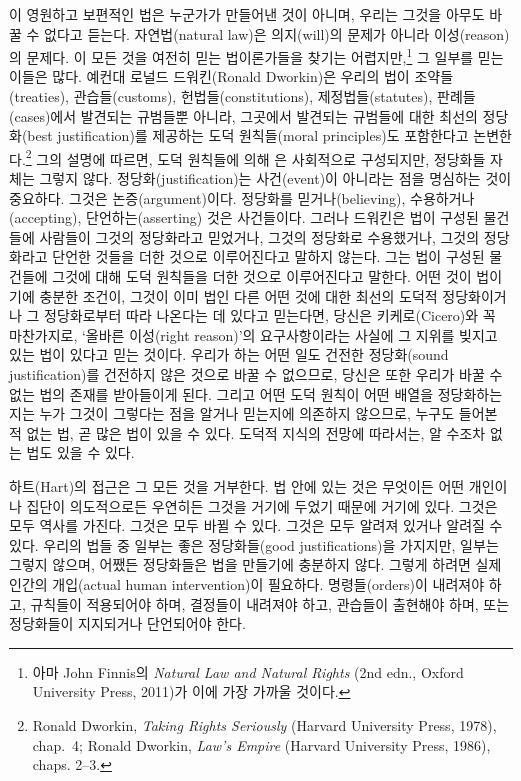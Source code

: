이 영원하고 보편적인 법은 누군가가 만들어낸 것이 아니며, 우리는 그것을
아무도 바꿀 수 없다고 듣는다. 자연법(natural law)은 의지(will)의 문제가
아니라 이성(reason)의 문제다. 이 모든 것을 여전히 믿는 법이론가들을
찾기는 어렵지만,\footnote{아마 John Finnis의 \emph{Natural Law and
  Natural Rights} (2nd edn., Oxford University Press, 2011)가 이에 가장
  가까울 것이다.} 그 일부를 믿는 이들은 많다. 예컨대 로널드
드워킨(Ronald Dworkin)은 우리의 법이 조약들(treaties), 관습들(customs),
헌법들(constitutions), 제정법들(statutes), 판례들(cases)에서 발견되는
규범들뿐 아니라, 그곳에서 발견되는 규범들에 대한 최선의 정당화(best
justification)를 제공하는 도덕 원칙들(moral principles)도 포함한다고
논변한다.\footnote{Ronald Dworkin, \emph{Taking Rights Seriously}
  (Harvard University Press, 1978), chap.~4; Ronald Dworkin, \emph{Law's
  Empire} (Harvard University Press, 1986), chaps. 2--3.} 그의 설명에
따르면, 도덕 원칙들에 의해 은
사회적으로 구성되지만, 정당화들 자체는 그렇지 않다.
정당화(justification)는 사건(event)이 아니라는 점을 명심하는 것이
중요하다. 그것은 논증(argument)이다. 정당화를 믿거나(believing),
수용하거나(accepting), 단언하는(asserting) 것은 사건들이다. 그러나
드워킨은 법이 구성된 물건들에 사람들이 그것의 정당화라고 믿었거나,
그것의 정당화로 수용했거나, 그것의 정당화라고 단언한 것들을 더한 것으로
이루어진다고 말하지 않는다. 그는 법이 구성된 물건들에 그것에 대해
 도덕 원칙들을 더한 것으로 이루어진다고 말한다.
어떤 것이 법이기에 충분한 조건이, 그것이 이미 법인 다른 어떤 것에 대한
최선의 도덕적 정당화이거나 그 정당화로부터 따라 나온다는 데 있다고
믿는다면, 당신은 키케로(Cicero)와 꼭 마찬가지로, ‘올바른 이성(right
reason)’의 요구사항이라는 사실에 그 지위를 빚지고 있는 법이 있다고 믿는
것이다. 우리가 하는 어떤 일도 건전한 정당화(sound justification)를
건전하지 않은 것으로 바꿀 수 없으므로, 당신은 또한 우리가 바꿀 수 없는
법의 존재를 받아들이게 된다. 그리고 어떤 도덕 원칙이 어떤 배열을
정당화하는지는 누가 그것이 그렇다는 점을 알거나 믿는지에 의존하지
않으므로, 누구도 들어본 적 없는 법, 곧 많은 법이 있을 수 있다. 도덕적
지식의 전망에 따라서는, 알 수조차 없는 법도 있을 수 있다.

하트(Hart)의 접근은 그 모든 것을 거부한다. 법 안에 있는 것은 무엇이든
어떤 개인이나 집단이 의도적으로든 우연히든 그것을 거기에 두었기 때문에
거기에 있다. 그것은 모두 역사를 가진다. 그것은 모두 바뀔 수 있다. 그것은
모두 알려져 있거나 알려질 수 있다. 우리의 법들 중 일부는 좋은
정당화들(good justifications)을 가지지만, 일부는 그렇지 않으며, 어쨌든
정당화들은 법을 만들기에 충분하지 않다. 그렇게 하려면 실제 인간의
개입(actual human intervention)이 필요하다. 명령들(orders)이 내려져야
하고, 규칙들이 적용되어야 하며, 결정들이 내려져야 하고, 관습들이
출현해야 하며, 또는 정당화들이 지지되거나 단언되어야 한다.

